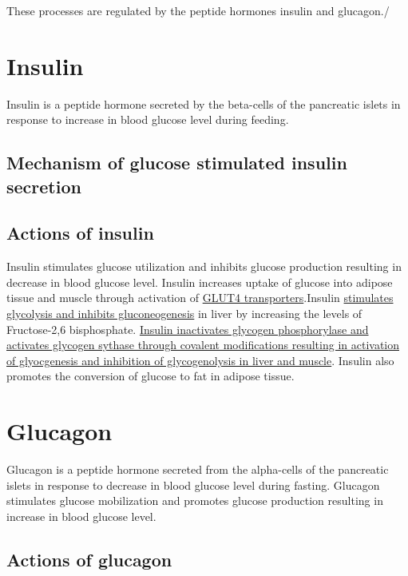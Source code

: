 \documentclass[
]{book}
\begin{document}
These processes are regulated by the peptide hormones insulin and glucagon./

\section{Insulin}\label{insulin}

Insulin is a peptide hormone secreted by the beta-cells of the pancreatic islets in response to increase in blood glucose level during feeding.

\subsection{Mechanism of glucose stimulated insulin secretion}\label{mechanism-of-glucose-stimulated-insulin-secretion}

\subsection{Actions of insulin}\label{actions-of-insulin}

Insulin stimulates glucose utilization and inhibits glucose production resulting in decrease in blood glucose level. Insulin increases uptake of glucose into adipose tissue and muscle through activation of \hyperref[glucose-transporters]{GLUT4 transporters}.Insulin \hyperref[regulation-of-glycolysis-and-gluconeogenesis]{stimulates glycolysis and inhibits gluconeogenesis} in liver by increasing the levels of Fructose-2,6 bisphosphate. \hyperref[hormonal-regulation-of-glycogen-metabolism]{Insulin inactivates glycogen phosphorylase and activates glycogen sythase through covalent modifications resulting in activation of glyocgenesis and inhibition of glycogenolysis in liver and muscle}. Insulin also promotes the conversion of glucose to fat in adipose tissue.

\section{Glucagon}\label{glucagon}

Glucagon is a peptide hormone secreted from the alpha-cells of the pancreatic islets in response to decrease in blood glucose level during fasting. Glucagon stimulates glucose mobilization and promotes glucose production resulting in increase in blood glucose level.

\subsection{Actions of glucagon}\label{actions-of-glucagon}
\end{document}
